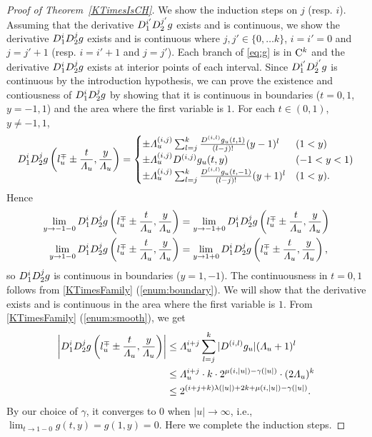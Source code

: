 \begin{proof}[Proof of Theorem~\ref{KTimesIsCH}]
We show the induction steps on $j$ (resp. $i$).
Assuming that the derivative $D_1^{i'} D_2^{j'} g$ exists and is continuous,
we show  the derivative $D_1^{i} D_2^{j} g$ exists and is continuous 
where $j, j' \in \{0, \dots k\}$, $i=i'=0$ and $j=j'+1$ (resp. $i=i'+1$ and $j=j'$).
Each branch of \eqref{eq:g} is in $\mathrm C^k$
and the derivative $D_1^{i} D_2^{j} g$ exists at interior points of each interval.
Since $D_1^{i'} D_2^{j'} g$ is continuous by the introduction hypothesis,
we can prove the existence and contiousness of $D_1^{i} D_2^{j} g$ 
by showing that it is continuous 
in boundaries ($t=0,1$, $y = -1, 1$) and the area where the first variable is $1$.
For each $t \in (0, 1)$, $y \neq -1, 1$,
\begin{equation}
   D_1^i D_2^j g \left(l^\mp_u \pm \frac{t}{\varLambda_u}, \frac{y}{\varLambda_u}\right)
   = \begin{cases}
      \pm \varLambda_u^{(i, j)} \sum^{k}_{l=j} \frac{D^{(i,l)} g_u(t,1)}{(l-j)!}
      (y - 1)^l &  (1<y)
      \\
      \pm \varLambda_u^{(i,j)} D^{(i, j)} g_u(t, y) & (-1 < y < 1)
      \\
      \pm \varLambda_u^{(i, j)} \sum^{k}_{l=j} 
      \frac{D^{(i,l)} g_u(t, -1)}{(l-j)!} (y + 1)^l &  (1<y).
    \end{cases}
\end{equation}
Hence
\begin{align*}
 \lim_{y \to -1-0}D_1^i D_2^j g \left(l^\mp_u \pm \frac{t}{\varLambda_u}, \frac{y}{\varLambda_u}\right) &
 = \lim_{y \to -1+0}D_1^i D_2^j g \left(l^\mp_u \pm \frac{t}{\varLambda_u}, \frac{y}{\varLambda_u}\right)
 \\
 \lim_{y \to 1-0}D_1^i D_2^j g \left(l^\mp_u \pm \frac{t}{\varLambda_u}, \frac{y}{\varLambda_u}\right) 
 &= \lim_{y \to 1+0}D_1^i D_2^j g \left(l^\mp_u \pm \frac{t}{\varLambda_u}, \frac{y}{\varLambda_u}\right),
\end{align*}
so $D_1^{i} D_2^{j} g$ is continuous in boundaries ($y = 1,-1$).
The continuousness in $t = 0, 1$ follows from \ref{KTimesFamily} (\ref{enum:boundary}).
We will show that the derivative exists and is continuous in the area where the first variable is $1$.
From \ref{KTimesFamily} (\ref{enum:smooth}), we get
 \begin{align}
  \left|D_1^i D_2^j g \left(l^\mp_u \pm \frac{t}{\varLambda_u},
  \frac{y}{\varLambda_u}\right)\right|
  &\le 
  \varLambda_u^{i+j} \sum^{k}_{l=j} |D^{(i,l)} g_u | (\varLambda_u + 1)^l 
  \notag
  \\
  &\le
  \varLambda_u^{i+j}  \cdot k \cdot 2^{\mu(i, |u|) - \gamma(|u|)} \cdot (2\varLambda_u)^k
  \notag
  \\
  & 
  \le  2^{(i+j+k)\lambda(|u|) + 2k + \mu(i, |u|)  - \gamma(|u|)}. 
  \label{eq:sizeofderivative}
 \end{align}
By our choice of $\gamma$, 
it converges to $0$ when $|u| \to \infty$, i.e.,
$\lim_{t \to 1-0} g(t,y) = g(1, y) = 0$.
Here we complete the induction steps.
\end{proof}